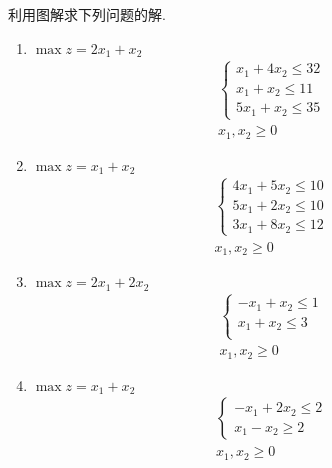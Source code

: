 利用图解求下列问题的解.
\begin{enumerate}
    \item 
    $\max z = 2x_1+x_2$
    \begin{align*}
        \begin{cases}
            x_1 + 4x_2 \le 32\\
            x_1 + x_2 \le 11\\
            5x_1 + x_2 \le 35
        \end{cases}\\
        x_1,x_2 \ge 0
    \end{align*}
    \item 
    $\max z = x_1+x_2$
    \begin{align*}
        \begin{cases}
            4x_1 + 5x_2 \le 10\\
            5x_1 + 2x_2 \le 10\\
            3x_1 + 8x_2 \le 12
        \end{cases}\\
        x_1,x_2 \ge 0
    \end{align*}
    \item 
    $\max z = 2x_1+2x_2$
    \begin{align*}
        \begin{cases}
            -x_1 + x_2 \le 1\\
            x_1 + x_2 \le 3\\
        \end{cases}\\
        x_1,x_2 \ge 0
    \end{align*}
    \item 
    $\max z = x_1+x_2$
    \begin{align*}
        \begin{cases}
            -x_1 + 2x_2 \le 2\\
            x_1 - x_2 \ge 2
        \end{cases}\\
        x_1,x_2 \ge 0
    \end{align*}
\end{enumerate}